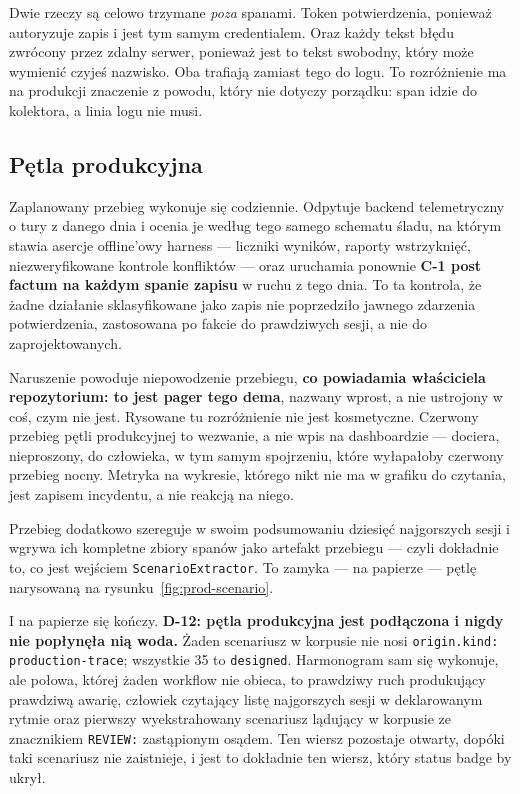 \documentclass[11pt,a4paper]{article}
\newcommand{\finding}[1]{{\color{primaryblue}\textbf{#1}}}
\begin{document}
Dwie rzeczy są celowo trzymane \emph{poza} spanami. Token potwierdzenia, ponieważ autoryzuje zapis i jest tym samym credentialem. Oraz każdy tekst błędu zwrócony przez zdalny serwer, ponieważ jest to tekst swobodny, który może wymienić czyjeś nazwisko. Oba trafiają zamiast tego do logu. To rozróżnienie ma na produkcji znaczenie z powodu, który nie dotyczy porządku: span idzie do kolektora, a linia logu nie musi.

\subsection{Pętla produkcyjna}

Zaplanowany przebieg wykonuje się codziennie. Odpytuje backend telemetryczny o tury z danego dnia i ocenia je według tego samego schematu śladu, na którym stawia asercje offline'owy harness --- liczniki wyników, raporty wstrzyknięć, niezweryfikowane kontrole konfliktów --- oraz uruchamia ponownie \textbf{C-1 post factum na każdym spanie zapisu} w ruchu z tego dnia. To ta kontrola, że żadne działanie sklasyfikowane jako zapis nie poprzedziło jawnego zdarzenia potwierdzenia, zastosowana po fakcie do prawdziwych sesji, a nie do zaprojektowanych.

Naruszenie powoduje niepowodzenie przebiegu, \finding{co powiadamia właściciela repozytorium: to jest pager tego dema}, nazwany wprost, a nie ustrojony w coś, czym nie jest. Rysowane tu rozróżnienie nie jest kosmetyczne. Czerwony przebieg pętli produkcyjnej to wezwanie, a nie wpis na dashboardzie --- dociera, nieproszony, do człowieka, w tym samym spojrzeniu, które wyłapałoby czerwony przebieg nocny. Metryka na wykresie, którego nikt nie ma w grafiku do czytania, jest zapisem incydentu, a nie reakcją na niego.

Przebieg dodatkowo szereguje w swoim podsumowaniu dziesięć najgorszych sesji i wgrywa ich kompletne zbiory spanów jako artefakt przebiegu --- czyli dokładnie to, co jest wejściem \texttt{ScenarioExtractor}. To zamyka --- na papierze --- pętlę narysowaną na rysunku~\ref{fig:prod-scenario}.

I na papierze się kończy. \textbf{D-12: pętla produkcyjna jest podłączona i nigdy nie popłynęła nią woda.} Żaden scenariusz w korpusie nie nosi \texttt{origin.kind: production-trace}; wszystkie 35 to \texttt{designed}. Harmonogram sam się wykonuje, ale połowa, której żaden workflow nie obieca, to prawdziwy ruch produkujący prawdziwą awarię, człowiek czytający listę najgorszych sesji w deklarowanym rytmie oraz pierwszy wyekstrahowany scenariusz lądujący w korpusie ze znacznikiem \texttt{REVIEW:} zastąpionym osądem. Ten wiersz pozostaje otwarty, dopóki taki scenariusz nie zaistnieje, i jest to dokładnie ten wiersz, który status badge by ukrył.
\end{document}
